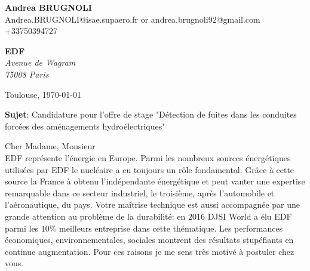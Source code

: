 \documentclass[11pt]{letter}
\begin{document}
 \sffamily
 \begin{flushleft}
 {\bfseries Andrea \textsc{BRUGNOLI}}\\[.35ex]
 Andrea.BRUGNOLI@isae.supaero.fr or andrea.brugnoli92@gmail.com\\
 +33750394727
 \end{flushleft}
 \begin{flushright}
 {\bfseries EDF}\\[.35ex]
 \small\itshape
 Avenue de Wagram\\
75008 Paris  
 \end{flushright}
 \begin{flushright}
 Toulouse, \today 
 \end{flushright}
 \textbf{Sujet}: Candidature pour l'offre de stage "Détection de fuites dans les conduites forcées des aménagements hydroélectriques" 

Cher Madame, Monsieur\\  
EDF représente l'énergie en Europe. Parmi les nombreux sources énergétiques utilisées par EDF le nucléaire a eu toujours un rôle fondamental. Grâce à cette source la France à obtenu l'indépendante énergétique et peut vanter une expertise remarquable dans ce secteur industriel, le troisième, après l'automobile et l'aéronautique, du pays. Votre maîtrise technique est aussi accompagnée par une grande attention au problème de la durabilité: en 2016 DJSI World a élu EDF parmi les 10\% meilleurs entreprise dans cette thématique. Les performances économiques, environnementales, sociales montrent des résultats stupéfiants en continue augmentation. Pour ces raisons je me sens très motivé à postuler chez vous.
\end{document}
